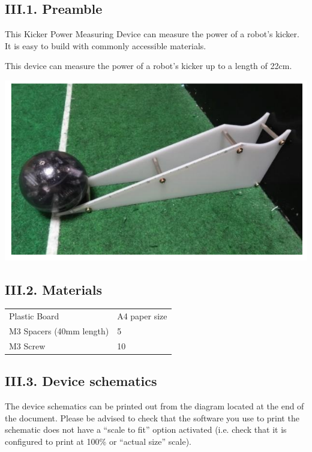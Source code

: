 \documentclass{article}
\begin{document}
\subsection{III.1. Preamble}

This Kicker Power Measuring Device can measure the power of a robot's kicker. It is easy to build with commonly accessible materials.

This device can measure the power of a robot's kicker up to a length of 22cm.

\includegraphics[width=1\textwidth]{media/image8.png}

\subsection{III.2. Materials}

\begin{table}
\begin{tabularx}{\textwidth}{
p{}
p{}}
Plastic Board & A4 paper size \\
M3 Spacers (40mm length) & 5 \\
M3 Screw & 10 \\

\end{tabularx}

\end{table}

\subsection{III.3. Device schematics}

The device schematics can be printed out from the diagram located at the end of the document. Please be advised to check that the software you use to print the schematic does not have a ``scale to fit'' option activated (i.e. check that it is configured to print at 100\% or ``actual size'' scale).
\end{document}
